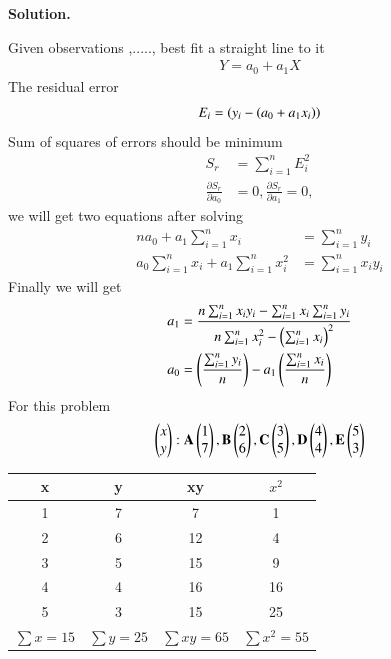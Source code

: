 \documentclass[journal,12pt,twocolumn]{IEEEtran}
\begin{document}
\textbf{Solution.}


Given observations ,.....,
best fit a straight line to it 
\begin{align}
Y=a_0+a_1X
\end{align}
The residual error 
\begin{align}
	E_i=\left(y_i-\left(a_0+a_1x_i\right)\right)
\end{align}
Sum of squares of errors should be minimum
\begin{align}
	S_r&= \sum_{i=1}^{n}{E_i^{2}}\\
    \frac{\partial S_r}{\partial a_0}&=0 ,
    \frac{\partial S_r}{\partial a_1}=0,
	\end{align}
we will get two equations after solving
\begin{align}
	na_0+a_1\sum_{i=1}^{n}x_i&= \sum_{i=1}^{n}y_i\\
	a_0\sum_{i=1}^{n}x_i+a_1\sum_{i=1}^{n}x_i^{2}&=\sum_{i=1}^{n}x_iy_i
	\end{align}
Finally we will get
\begin{align}
	a_1&=\frac{n\sum_{i=1}^{n}x_iy_i-\sum_{i=1}^{n}x_i\sum_{i=1}^{n}y_i}{n\sum_{i=1}^{n}x_i^{2}-\left(\sum_{i=1}^{n}x_i\right)^{2}}
	\\
	a_0&=\left(\frac{\sum_{i=1}^{n}y_i}{n}\right)-a_1\left(\frac{\sum_{i=1}^{n}x_i}{n}\right)
	\end{align}
For this problem 
\begin{align}
\begin{pmatrix}x \\y \end{pmatrix}:
\mathbf{A}\begin{pmatrix}1 \\7 \end{pmatrix},
\mathbf {B}\begin{pmatrix}2 \\6 \end{pmatrix},
\mathbf {C}\begin{pmatrix}3 \\5 \end{pmatrix},
 \mathbf {D}\begin{pmatrix}4 \\4 \end{pmatrix},
\mathbf {E}\begin{pmatrix}5 \\3 \end{pmatrix}
\end{align}
\begin{table}[H]
	\resizebox{\columnwidth}{!} {
		\begin{tabular}{|c|c|c|c|}
			\hline
			x & y & xy & $x^{2}$ \\
			\hline
			1 &  7 & 7  &1 \\
		
				2 &  6 & 12   &4 \\
			
				3 &  5 & 15  &9 \\
			
				4 &  4 & 16  &16 \\
			
				5 &  3 & 15  &25 \\
			\hline
			$\sum x=15$ &$\sum  y=25$ &$\sum xy=65$  &$\sum x^2=55$  \\
			\hline
		\end{tabular}
	}
\end{table}
\end{document}

